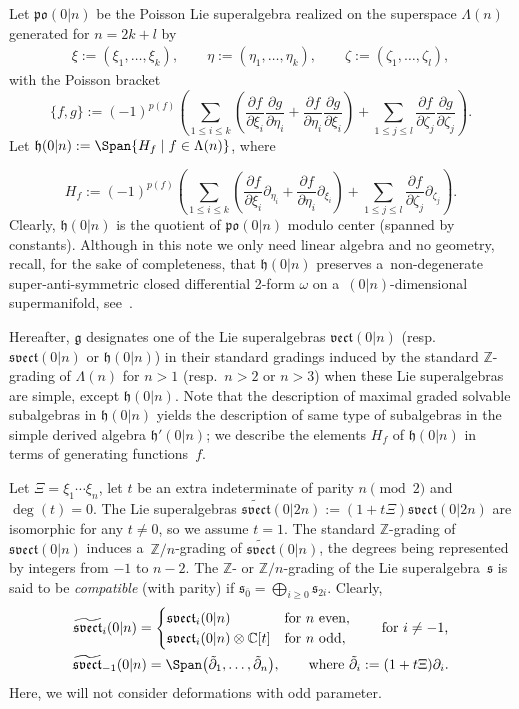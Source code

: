 \documentclass[pdftex]{sigma}
\newcommand{\del}{\partial}
\newcommand {\Cee} {{\mathbb C}}
\newcommand {\Zee} {{\mathbb Z}}
\newcommand {\fg} {{\mathfrak{g}}} %
\newcommand {\fh} {{\mathfrak{h}}}
\newcommand {\fpo} {{\mathfrak{po}}}
\newcommand {\fs} {{\mathfrak{s}}}
\newcommand {\fsvect} {{\mathfrak{svect}}}
\newcommand {\fvect} {{\mathfrak{vect}}} %
\newcommand {\ev} {{\bar0}}
\newcommand {\<} [2] {{\left.\vphantom{#2}\right.^{#1\!}\!{#2}}}
\numberwithin{equation}{section}
\begin{document}
Let $\fpo(0|n)$ be the Poisson Lie superalgebra realized on the superspace $\Lambda(n)$ generated for $n=2k+l$ by
\begin{gather}\label{indH}
\xi:=(\xi_1, \dots, \xi_k), \qquad \eta:=(\eta_1, \dots, \eta_k), \qquad \zeta:=(\zeta_1, \dots, \zeta_l),
\end{gather}
with the Poisson bracket
\[
\{f, g\}:=(-1)^{p(f)}\left(\sum_{1\leq i\leq k}\left(\frac{\del f}{\del \xi_i}\frac{\del g}{\del {\eta_i}} +\frac{\del f}{\del \eta_i}\frac{\del g}{\del {\xi_i}}\right)+\sum_{1\leq j\leq l}\frac{\del f}{\del \zeta_j}\frac{\del g}{\del {\zeta_j}}\right).
\]
Let $\fh(0|n):=\Span\{H_f\mid f\in\Lambda(n)\}$, where{\samepage
\[
H_f:=(-1)^{p(f)}\left(\sum_{1\leq i\leq k}\left(\frac{\del f}{\del \xi_i}\del_{\eta_i} +\frac{\del f}{\del \eta_i}\del_ {\xi_i}\right)+\sum_{1\leq j\leq l}\frac{\del f}{\del \zeta_j}\del_ {\zeta_j}\right).
\]
Clearly, $\fh(0|n)$ is the quotient of $\fpo(0|n)$ modulo center (spanned by constants). Although in this note we only need linear algebra and no geometry, recall, for the sake of completeness, that $\fh(0|n)$ preserves a~non-degenerate super-anti-symmetric closed differential 2-form $\omega$ on a~$(0|n)$-dimensional supermanifold, see~\cite{Lo}.

}

Hereafter, $\fg$ designates one of the Lie superalgebras $\fvect(0|n)$ (resp.\ $\fsvect(0|n)$ or $\fh(0|n)$) in their standard gradings induced by the standard $\Zee$-grading of $\Lambda(n)$ for $n>1$ (resp.\ $n>2$ or $n>3$) when these Lie superalgebras are simple, except $\fh(0|n)$.
Note that the description of maximal graded solvable subalgebras in $\fh(0|n)$ yields the description of same type of subalgebras in the simple derived algebra $\fh'(0|n)$; we describe the elements $H_f$ of $\fh(0|n)$ in terms of generating functions~$f$.

Let $\Xi=\xi_1\cdots\xi_n$, let $t$ be an extra indeterminate of parity $n\pmod 2$ and $\deg(t)=0$. The Lie superalgebras $\widetilde{\fsvect}(0|2n):=(1+t\Xi)\fsvect(0|2n)$ are isomorphic for any $t\neq 0$, so we assume $t=1$. The standard $\Zee$-grading of $\fsvect(0|n)$ induces a~$\Zee/n$-grading of $\widetilde{\fsvect}(0|n)$, the degrees being represented by integers from $-1$ to $n-2$. The $\Zee$- or $\Zee/n$-grading of the Lie superalgebra~$\fs$ is said to be \textit{compatible} (with parity) if $\fs_\ev=\bigoplus_{i\geq 0} \fs_{2i}$. Clearly,
\begin{gather*}
\widetilde{\fsvect}_i(0|n)=\begin{cases}\fsvect_i(0|n)&\text{for $n$ even},\\
\fsvect_i(0|n)\otimes \Cee[t]&\text{for $n$ odd},\end{cases} \qquad \text{for $i\neq -1$,}\\ \widetilde{\fsvect}_{-1}(0|n)=\Span\bigl(\tilde{\del}_1,\dots,\tilde{\del}_n\bigr), \qquad \text{where $\tilde{\del}_i:=(1+t\Xi)\del_i$}.
\end{gather*}
Here, we will not consider deformations with odd parameter.
\end{document}

